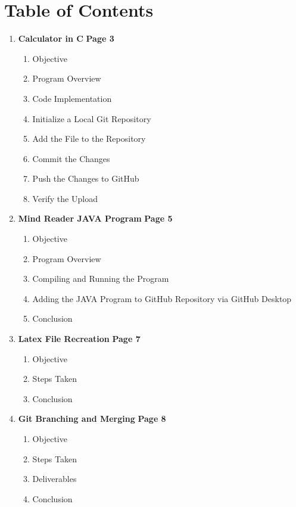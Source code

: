 \section*{Table of Contents}

\begin{enumerate}
    \item \textbf{Calculator in C} \hfill \textbf{Page 3}
    \begin{enumerate}
        \renewcommand{\labelenumii}{\arabic{enumi}.\arabic{enumii}}
        \item Objective
        \item Program Overview
        \item Code Implementation
        \item Initialize a Local Git Repository
        \item Add the File to the Repository
        \item Commit the Changes
        \item Push the Changes to GitHub
        \item Verify the Upload
    \end{enumerate}
    
    \item \textbf{Mind Reader JAVA Program} \hfill \textbf{Page 5}
    \begin{enumerate}
        \renewcommand{\labelenumii}{\arabic{enumi}.\arabic{enumii}}
        \item Objective
        \item Program Overview
        \item Compiling and Running the Program
        \item Adding the JAVA Program to GitHub Repository via GitHub Desktop
        \item Conclusion
    \end{enumerate}
    
    \item \textbf{Latex File Recreation} \hfill \textbf{Page 7}
    \begin{enumerate}
        \renewcommand{\labelenumii}{\arabic{enumi}.\arabic{enumii}}
        \item Objective
        \item Steps Taken
        \item Conclusion
    \end{enumerate}
    
    \item \textbf{Git Branching and Merging} \hfill \textbf{Page 8}
    \begin{enumerate}
        \renewcommand{\labelenumii}{\arabic{enumi}.\arabic{enumii}}
        \item Objective
        \item Steps Taken
        \item Deliverables
        \item Conclusion
    \end{enumerate}
    

\end{enumerate}
